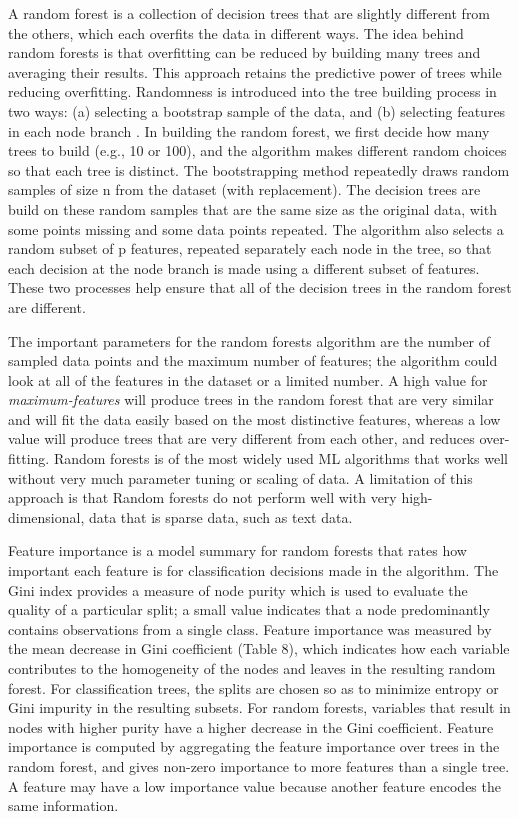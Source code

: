 \documentclass[sigconf]{acmart}
\begin{document}
A random forest is a collection of decision trees that are slightly different 
from the others, which each overfits the data in different ways. The idea 
behind random forests is that overfitting can be reduced by building many 
trees and averaging their results. This approach retains the predictive power 
of trees while reducing overfitting. Randomness is introduced into the tree 
building process in two ways: (a) selecting a bootstrap sample of the data, 
and (b) selecting features in each node branch \cite{muller17,raschka17}. In 
building the random forest, we first decide how many trees to build (e.g., 10 
or 100), and the algorithm makes different random choices so that each tree is 
distinct. The bootstrapping method repeatedly draws random samples of size n 
from the dataset (with replacement). The decision trees are build on these 
random samples that are the same size as the original data, with some points 
missing and some data points repeated. The algorithm also selects a random 
subset of p features, repeated separately each node in the tree, so that 
each decision at the node branch is made using a different subset of features.
These two processes help ensure that all of the decision trees in the random
forest are different. 

The important parameters for the random forests 
algorithm are the number of sampled data points and the maximum number of 
features; the algorithm could look at all of the features in the dataset
or a limited number. A high value for \emph{maximum-features} will produce 
trees in the random forest that are very similar and will fit the data 
easily based on the most distinctive features, whereas a low value will 
produce trees that are very different from each other, and reduces over-
fitting. Random forests is of the most widely used ML algorithms that works 
well without very much parameter tuning or scaling of data. A limitation of 
this approach is that Random forests do not perform well with very high-
dimensional, data that is sparse data, such as text data.



Feature importance is a model summary for random forests 
that rates how important each feature is for classification decisions made 
in the algorithm. The Gini index provides a measure of node purity which is 
used to evaluate the quality of a particular split; a small value indicates 
that a node predominantly contains observations from a single class. 
Feature importance was measured by the mean decrease in Gini coefficient 
(Table 8), which indicates how each variable contributes to the homogeneity 
of the nodes and leaves in the resulting random forest. For classification 
trees, the splits are chosen so as to minimize entropy or Gini impurity in 
the resulting subsets. For random forests, variables that result in nodes 
with higher purity have a higher decrease in the Gini coefficient. Feature 
importance is computed by aggregating the feature importance over trees in 
the random forest, and gives non-zero importance to more features than a 
single tree. A feature may have a low importance value because another feature 
encodes the same information. 
\end{document}
